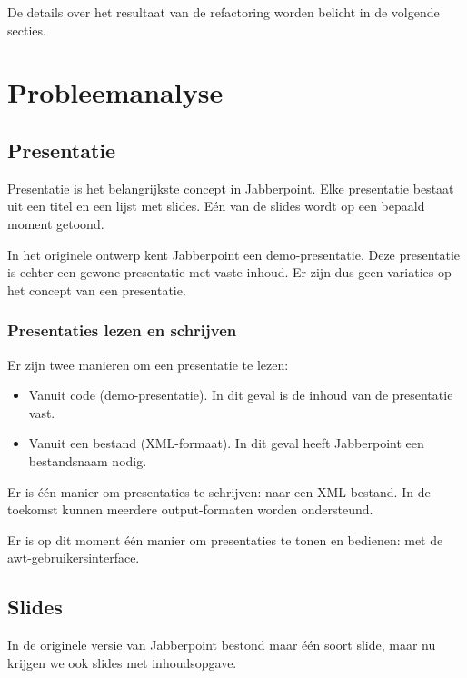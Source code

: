 \documentclass[a4paper]{article}
\begin{document}
	De details over het resultaat van de refactoring worden belicht in de volgende secties.

\section{Probleemanalyse}
    \label{sec:probleemanalyse}

	\subsection{Presentatie}\label{sec:presentatie-analyse}
		Presentatie is het belangrijkste concept in Jabberpoint.
		Elke presentatie bestaat uit een titel en een lijst met slides.
		Eén van de slides wordt op een bepaald moment getoond.

		In het originele ontwerp kent Jabberpoint een demo-presentatie.
		Deze presentatie is echter een gewone presentatie met vaste inhoud.
		Er zijn dus geen variaties op het concept van een presentatie.

		\subsubsection{Presentaties lezen en schrijven}
			Er zijn twee manieren om een presentatie te lezen:
			\begin{itemize}
				\item Vanuit code (demo-presentatie).
					In dit geval is de inhoud van de presentatie vast.
				\item Vanuit een bestand (XML-formaat).
					In dit geval heeft Jabberpoint een bestandsnaam nodig.
			\end{itemize}

			Er is één manier om presentaties te schrijven: naar een XML-bestand.
			In de toekomst kunnen meerdere output-formaten worden ondersteund.

			Er is op dit moment één manier om presentaties te tonen en bedienen: met de awt-gebruikersinterface.

	\subsection{Slides}\label{sec:slides-analyse}
		In de originele versie van Jabberpoint bestond maar één soort slide, maar nu krijgen we ook slides met inhoudsopgave.
\end{document}
